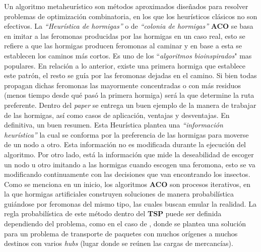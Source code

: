                 Un algoritmo metaheurístico son métodos aproximados diseñados para resolver problemas de optimización combinatoria, en los que los heurísticos clásicos no son efectivos.
                La \textit{``Heurística de hormigas''} o de \textit{``colonia de hormigas''} \textbf{ACO} se basa en imitar a las feromonas producidas por las hormigas en un caso real, esto se refiere a que las hormigas producen feromonas al caminar y en base a esta se establecen los caminos más cortos. Es uno de los ``\textit{algoritmos bioinspirados}" mas populares.
                \newline
                \newline
                En relación a lo anterior, existe una primera hormiga que establece este patrón, el resto se guía por las feromonas dejadas en el camino. Si bien todas propagan dichas feromonas las mayormente concentradas o con más residuos (menos tiempo desde qué pasó la primera hormiga) será la que determine la ruta preferente. Dentro del \textit{paper} \parencite{ACO} se entrega un buen ejemplo de la manera de trabajar de las hormigas, así como casos de aplicación, ventajas y desventajas. En definitiva, un buen resumen.
                \newline
                \newline
                Esta Heurística plantea una \textit{``información heurística''} la cual se conforma por la preferencia de las hormigas para moverse de un nodo a otro. Esta información no es modificada durante la ejecución del algoritmo. Por otro lado, está la información que mide la deseabilidad de escoger un nodo u otro imitando a las hormigas cuando escogen una feromona, esto se va modificando continuamente con las decisiones que van encontrando los insectos.  
                \newline
                \newline
                Como se menciona en un inicio, los algoritmos \textbf{ACO} son procesos iterativos, en la que hormigas artificiales construyen soluciones de manera probabilística guiándose por feromonas del mismo tipo, las cuales buscan emular la realidad. La regla probabilística de este método dentro del \textbf{TSP} puede ser definida dependiendo del problema, como en el caso de \parencite{ACOTRANSPORTE}, donde se plantea una solución para un problema de transporte de paquetes con muchos orígenes a muchos destinos con varios \textit{hubs} (lugar donde se reúnen las cargas de mercancías).
                \newline
